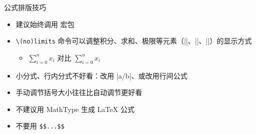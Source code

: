 
\begin{frame}[fragile]{公式排版技巧}
  \begin{itemize}
    \item 建议始终调用  宏包
    \item \lstinline[style=style@inline]|\(no)limits| 命令可以调整积分、求和、极限等元素（|\int|、|\sum|、|\lim|）的显示方式
          \begin{itemize}
            \item $\sum\limits_{i=0}^n {x_i}$ 对比 $\sum\nolimits_{i=0}^n {x_i}$
          \end{itemize}
    \item 小分式、行内分式不好看：改用 |a/b|、或改用行间公式
    \item 手动调节括号大小往往比自动调节更好看
    \item \alert{不建议用 MathType 生成 \LaTeX{} 公式}
    \item \alert{不要用 \texttt{\$\$...\$\$}}
  \end{itemize}
\end{frame}
